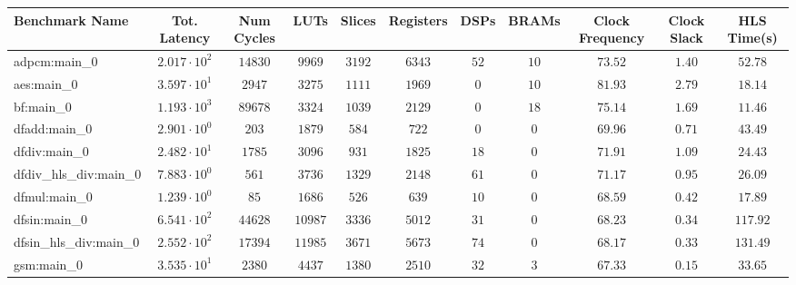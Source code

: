 \begin{tabular}{|l|c|c|c|c|c|c|c|c|c|c|}
\hline
Benchmark Name          & Tot. Latency           & Num Cycles & LUTs      & Slices    & Registers & DSPs    & BRAMs   & Clock Frequency & Clock Slack & HLS Time(s) \\
\hline
adpcm:main\_0           & $ 2.017 \cdot 10^{2} $ & $ 14830  $ & $ 9969  $ & $ 3192  $ & $ 6343  $ & $ 52  $ & $ 10  $ & $ 73.52       $ & $ 1.40    $ & $ 52.78   $ \\
aes:main\_0             & $ 3.597 \cdot 10^{1} $ & $ 2947   $ & $ 3275  $ & $ 1111  $ & $ 1969  $ & $ 0   $ & $ 10  $ & $ 81.93       $ & $ 2.79    $ & $ 18.14   $ \\
bf:main\_0              & $ 1.193 \cdot 10^{3} $ & $ 89678  $ & $ 3324  $ & $ 1039  $ & $ 2129  $ & $ 0   $ & $ 18  $ & $ 75.14       $ & $ 1.69    $ & $ 11.46   $ \\
dfadd:main\_0           & $ 2.901 \cdot 10^{0} $ & $ 203    $ & $ 1879  $ & $ 584   $ & $ 722   $ & $ 0   $ & $ 0   $ & $ 69.96       $ & $ 0.71    $ & $ 43.49   $ \\
dfdiv:main\_0           & $ 2.482 \cdot 10^{1} $ & $ 1785   $ & $ 3096  $ & $ 931   $ & $ 1825  $ & $ 18  $ & $ 0   $ & $ 71.91       $ & $ 1.09    $ & $ 24.43   $ \\
dfdiv\_hls\_div:main\_0 & $ 7.883 \cdot 10^{0} $ & $ 561    $ & $ 3736  $ & $ 1329  $ & $ 2148  $ & $ 61  $ & $ 0   $ & $ 71.17       $ & $ 0.95    $ & $ 26.09   $ \\
dfmul:main\_0           & $ 1.239 \cdot 10^{0} $ & $ 85     $ & $ 1686  $ & $ 526   $ & $ 639   $ & $ 10  $ & $ 0   $ & $ 68.59       $ & $ 0.42    $ & $ 17.89   $ \\
dfsin:main\_0           & $ 6.541 \cdot 10^{2} $ & $ 44628  $ & $ 10987 $ & $ 3336  $ & $ 5012  $ & $ 31  $ & $ 0   $ & $ 68.23       $ & $ 0.34    $ & $ 117.92  $ \\
dfsin\_hls\_div:main\_0 & $ 2.552 \cdot 10^{2} $ & $ 17394  $ & $ 11985 $ & $ 3671  $ & $ 5673  $ & $ 74  $ & $ 0   $ & $ 68.17       $ & $ 0.33    $ & $ 131.49  $ \\
gsm:main\_0             & $ 3.535 \cdot 10^{1} $ & $ 2380   $ & $ 4437  $ & $ 1380  $ & $ 2510  $ & $ 32  $ & $ 3   $ & $ 67.33       $ & $ 0.15    $ & $ 33.65   $ \\

\end{tabular}
